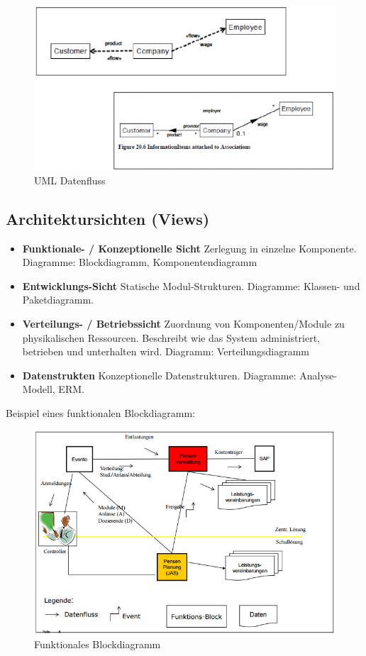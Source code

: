 \begin{figure}[h!]
	\centering
	\includegraphics[width=0.7\linewidth]{fig/uml-datenfluss}
	\caption{UML Datenfluss}
	\label{fig:uml-datenfluss}
\end{figure}

\subsection{Architektursichten (Views)}
\begin{itemize}
	\item \textbf{Funktionale- / Konzeptionelle Sicht} Zerlegung in einzelne Komponente. Diagramme: Blockdiagramm, Komponentendiagramm 
	\item \textbf{Entwicklungs-Sicht} Statische Modul-Strukturen. Diagramme: Klassen- und Paketdiagramm. 
	\item \textbf{Verteilungs- / Betriebssicht} Zuordnung von Komponenten/Module zu physikalischen Ressourcen. Beschreibt wie das System administriert, betrieben und unterhalten wird. Diagramm: Verteilungsdiagramm
	\item \textbf{Datenstrukten} Konzeptionelle Datenstrukturen. Diagramme: Analyse-Modell, ERM. 
\end{itemize}

Beispiel eines funktionalen Blockdiagramm:
\begin{figure}[h!]
\centering
\includegraphics[width=0.8\linewidth]{fig/funktionales-blockdiagramm}
\caption{Funktionales Blockdiagramm}
\label{fig:funktionales-blockdiagramm}
\end{figure}

